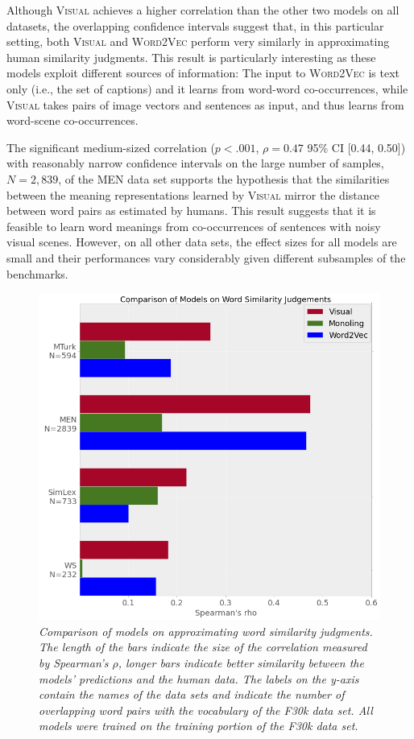 Although \textsc{Visual} achieves a higher correlation than the other
two models on all datasets, \label{rev:variability} the overlapping confidence
intervals suggest that, in this particular setting, both
\textsc{Visual} and \textsc{Word2Vec} perform very similarly in
approximating human similarity judgments. This result is particularly
interesting as these models exploit different sources of information:
The input to \textsc{Word2Vec} is text only (i.e., the set of captions)
and it learns from word-word co-occurrences, while \textsc{Visual}
takes pairs of image vectors and sentences as input, and thus learns
from word-scene co-occurrences.

The significant medium-sized correlation ($p<.001$, $\rho=0.47$ 95\%
CI [0.44, 0.50]) with reasonably narrow confidence intervals on the
large number of samples, $N=2,839$, of the MEN data set supports the hypothesis
that the similarities between the meaning representations learned by \textsc{Visual}
mirror the distance between word pairs as estimated by humans.
This result suggests that it is feasible to learn word meanings from
co-occurrences of sentences with noisy visual scenes. However, on all other data sets,
the effect sizes for all models are small and their performances vary considerably given
different subsamples of the benchmarks.\label{ref:small_correlation}



\begin{figure}
\centering
\includegraphics[scale=0.35]{chapters/TAL/modelcomparison}
\caption{\textit{Comparison of models on approximating word similarity
  judgments. The length of the bars indicate the size of the
  correlation measured by Spearman's $\rho$, longer bars indicate
  better similarity between the models' predictions and the human
  data. The labels on the y-axis contain the names of the data sets
  and indicate the number of overlapping word pairs with the
  vocabulary of the F30k data set. All models were trained on
  the training portion of the F30k data set.}}
\label{fig:wsj-online}
\end{figure}

